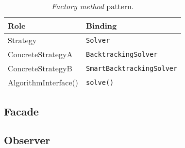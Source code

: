 \documentclass[a4paper, 11pt]{article}
\begin{document}
\begin{table}[h!]
\centering
\begin{tabular}{l l}
\textbf{Role}        & \textbf{Binding} \\ \hline
Strategy             & \texttt{Solver} \\
ConcreteStrategyA    & \texttt{BacktrackingSolver} \\
ConcreteStrategyB    & \texttt{SmartBacktrackingSolver} \\
AlgorithmInterface() & \texttt{solve()} \\
\end{tabular}
\caption{\textit{Factory method} pattern.}
\label{table:strategy}
\end{table}

\subsection{Facade}

\subsection{Observer}
\end{document}
